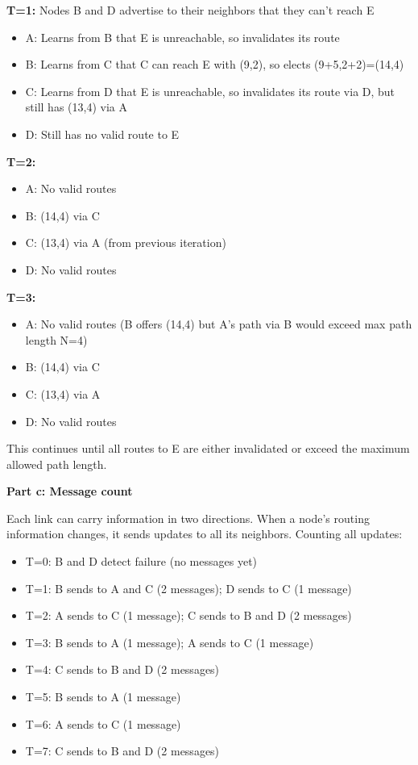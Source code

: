 \documentclass[11pt,a4paper]{article}
\begin{document}
\textbf{T=1:} Nodes B and D advertise to their neighbors that they can't reach E
\begin{itemize}
    \item A: Learns from B that E is unreachable, so invalidates its route
    \item B: Learns from C that C can reach E with (9,2), so elects (9+5,2+2)=(14,4)
    \item C: Learns from D that E is unreachable, so invalidates its route via D, but still has (13,4) via A
    \item D: Still has no valid route to E
\end{itemize}

\textbf{T=2:}
\begin{itemize}
    \item A: No valid routes
    \item B: (14,4) via C
    \item C: (13,4) via A (from previous iteration)
    \item D: No valid routes
\end{itemize}

\textbf{T=3:}
\begin{itemize}
    \item A: No valid routes (B offers (14,4) but A's path via B would exceed max path length N=4)
    \item B: (14,4) via C
    \item C: (13,4) via A
    \item D: No valid routes
\end{itemize}

This continues until all routes to E are either invalidated or exceed the maximum allowed path length.

\textbf{Part c: Message count}

Each link can carry information in two directions. When a node's routing information changes, it sends updates to all its neighbors. Counting all updates:
\begin{itemize}
    \item T=0: B and D detect failure (no messages yet)
    \item T=1: B sends to A and C (2 messages); D sends to C (1 message)
    \item T=2: A sends to C (1 message); C sends to B and D (2 messages)
    \item T=3: B sends to A (1 message); A sends to C (1 message)
    \item T=4: C sends to B and D (2 messages)
    \item T=5: B sends to A (1 message)
    \item T=6: A sends to C (1 message)
    \item T=7: C sends to B and D (2 messages)
\end{itemize}
\end{document}
